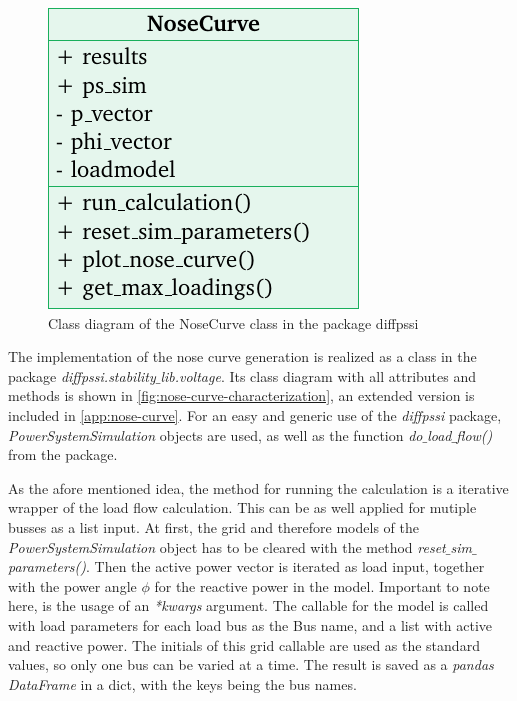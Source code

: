 \begin{figure}
        \centering
        \includegraphics[width=.9\linewidth]{tikz_graphics/images/class_diagram_nosecurve_red.pdf}
        \caption{Class diagram of the NoseCurve class in the package diffpssi}
        \label{fig:nose-curve-characterization}
\end{figure}
The implementation of the nose curve generation is realized as a class in the package {\itshape diffpssi.stability$\_$lib.voltage}.
Its class diagram with all attributes and methods is shown in \autoref{fig:nose-curve-characterization}, an extended version is included in \autoref{app:nose-curve}.
For an easy and generic use of the {\itshape diffpssi} package, {\itshape PowerSystemSimulation} objects are used, as well as the function {\itshape do$\_$load$\_$flow()} from the package.

As the afore mentioned idea, the method for running the calculation is a iterative wrapper of the load flow calculation. 
This can be as well applied for mutiple busses as a list input.
At first, the grid and therefore models of the {\itshape PowerSystemSimulation} object has to be cleared with the method {\itshape reset$\_$sim$\_$parameters()}.
Then the active power vector is iterated as load input, together with the power angle $\phi$ for the reactive power in the model.
Important to note here, is the usage of an {\itshape **kwargs} argument.
The callable for the model is called with load parameters for each load bus as the Bus name, and a list with active and reactive power.
The initials of this grid callable are used as the standard values, so only one bus can be varied at a time.
The result is saved as a {\itshape pandas DataFrame} in a dict, with the keys being the bus names.


